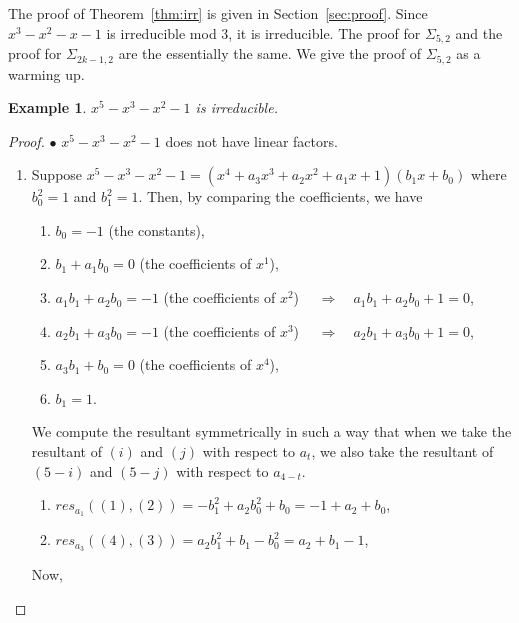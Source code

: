 \documentclass{amsart}
\newtheorem{ex}[thm]{Example}
\theoremstyle{definition}
\theoremstyle{remark}
\begin{document}
The proof of Theorem~\ref{thm:irr} is given in Section~\ref{sec:proof}. Since $x^3-x^2-x-1$ is irreducible mod 3, it is irreducible. The proof for $\Sigma_{5,2}$ and the proof for 
$\Sigma_{2k-1,2}$ are the essentially the same. We give the proof of $\Sigma_{5,2}$ as a warming up.

\begin{ex} \label{ex:2}
$x^5-x^3-x^2-1$ is irreducible.
\end{ex} 

\begin{proof}
$\bullet$ $x^5-x^3-x^2-1$ does not have linear factors.
\begin{enumerate} 
\item[I.] Suppose $x^5-x^3-x^2-1=(x^4+a_3 x^3+a_2 x^2+a_1 x+1)(b_1 x+b_0)$ where $b_0^2=1$ and $b_1^2=1$. 
Then, by comparing the coefficients, we have

\begin{enumerate}
\item[(0)] $b_0=-1$ (the constants), \\
\item[(1)] $b_1+a_1 b_0=0$ (the coefficients of $x^1$), \\
\item[(2)] $a_1 b_1+a_2 b_0=-1$ (the coefficients of $x^2$) $\quad \Rightarrow \quad a_1 b_1+a_2 b_0+1=0$,\\
\item[(3)] $a_2 b_1+a_3 b_0=-1$ (the coefficients of $x^3$) $\quad \Rightarrow \quad a_2 b_1+a_3 b_0+1=0$, \\
\item[(4)] $a_3 b_1+b_0=0$ (the coefficients of $x^4$), \\
\item[(5)] $b_1=1$.
\end{enumerate}


We compute the resultant symmetrically in such a way that when we take the resultant of $(i)$ and $(j)$ with respect to $a_{t}$, we also take the resultant of $(5-i)$ and $(5-j)$ with respect to $a_{4-t}$.

\begin{enumerate}
\item[(6)] $res_{a_1}((1),(2))=-b_1^2+a_2b_0^2+b_0=-1+a_2+b_0$,
\item[(7)] $res_{a_3}((4),(3))=a_2 b_1^2+b_1-b_0^2=a_2+b_1-1$,
\end{enumerate}

Now,


\end{enumerate}
\end{proof}
\end{document}
